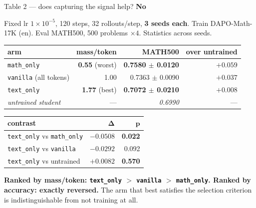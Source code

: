 \documentclass[aspectratio=169,11pt]{beamer}
\newcommand{\up}[1]{\textcolor{good}{\textbf{#1}}}
\newcommand{\dn}[1]{\textcolor{bad}{\textbf{#1}}}
\newcommand{\aside}[1]{{\footnotesize\textcolor{mut}{#1}}}
\begin{document}
\begin{frame}{Table 2 --- does capturing the signal help? \dn{No}}

\aside{Fixed lr $1\times10^{-5}$, 120 steps, 32 rollouts/step, \textbf{3 seeds each}.
Train DAPO-Math-17K (en). Eval MATH500, 500 problems $\times4$. Statistics across seeds.}

\vspace{0.8em}
\centering
{\small
\begin{tabular}{@{}lrrr@{}}
\toprule
\textbf{arm} & \textbf{mass/token} & \textbf{MATH500} & \textbf{over untrained} \\
\midrule
\texttt{math\_only}          & \dn{0.55} \aside{(worst)} & \up{0.7580 $\pm$ 0.0120} & $+0.059$ \\
\texttt{vanilla} (all tokens)& 1.00                      & 0.7363 $\pm$ 0.0090      & $+0.037$ \\
\texttt{text\_only}          & \up{1.77} \aside{(best)}  & \dn{0.7072 $\pm$ 0.0210} & $+0.008$ \\
\midrule
\emph{untrained student}     & ---                       & \emph{0.6990}            & --- \\
\bottomrule
\end{tabular}}

\vspace{0.8em}
{\small
\begin{tabular}{@{}lrr@{}}
\toprule
\textbf{contrast} & $\boldsymbol{\Delta}$ & $\boldsymbol{p}$ \\
\midrule
\texttt{text\_only} vs \texttt{math\_only} & $-0.0508$ & \up{0.022} \\
\texttt{text\_only} vs \texttt{vanilla}    & $-0.0292$ & 0.092 \\
\texttt{text\_only} vs untrained           & $+0.0082$ & \dn{0.570} \\
\bottomrule
\end{tabular}}

\flushleft
\vspace{0.6em}
\textbf{Ranked by mass/token: \texttt{text\_only} $>$ \texttt{vanilla} $>$ \texttt{math\_only}.
Ranked by accuracy: exactly reversed.} The arm that best satisfies the selection criterion is
indistinguishable from not training at all.

\end{frame}
\end{document}

